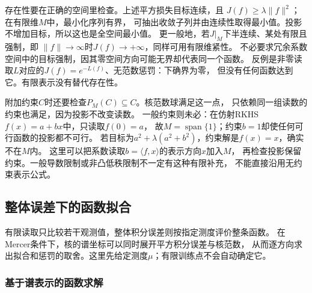 存在性要在正确的空间里检查。上述平方损失目标连续，且
$J(f)\geq\lambda\lVert f\rVert^2$；在有限维$M$中，最小化序列有界，
可抽出收敛子列并由连续性取得最小值。投影不增加目标，所以这也是全空间最小值。
更一般地，若$J|_M$下半连续、某处有限且强制，即
$\lVert f\rVert\to\infty$时$J(f)\to+\infty$，同样可用有限维紧性。
不必要求冗余系数空间中的目标强制，因其零空间方向可能无界却代表同一个函数。
反例是非零读取$L$对应的$J(f)=e^{-L(f)}$、无范数惩罚：下确界为零，
但没有任何函数达到它。有限表示没有替代存在性。

附加约束$C$时还要检查$P_M(C)\subseteq C$。核范数球满足这一点，
只依赖同一组读数的约束也满足，因为投影不改变读数。
一般约束则未必：在仿射RKHS$f(x)=a+bx$中，只读取$f(0)=a$，
故$M=\operatorname{span}\{1\}$；约束$b=1$却使任何可行函数的投影都不可行。
若目标为$a^2+\lambda(a^2+b^2)$，约束解是$f(x)=x$，确实不在$M$内。
这里可以把系数读取$b=\langle f,x\rangle$的表示方向$x$加入$M$，
再检查投影保留约束。一般导数限制或非凸低秩限制不一定有这种有限补充，
不能直接沿用无约束表示公式。

\subsection{整体误差下的函数拟合}
\label{sec:functional-integral-error-fitting}

有限读取只比较若干观测值，整体积分误差则按指定测度评价整条函数。
在Mercer条件下，核的谱坐标可以同时展开平方积分误差与核范数，
从而逐方向求出拟合和惩罚的取舍。这里先给定测度$\mu$；有限训练点不会自动确定它。

\subsubsection{基于谱表示的函数求解}
\label{sec:functional-spectral-fitting-solvers}

